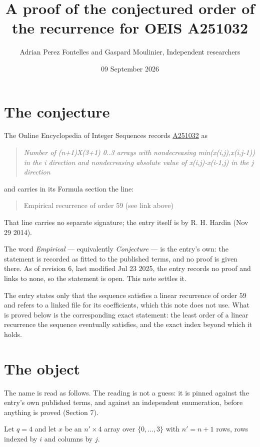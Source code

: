 \documentclass[11pt]{article}
\title{A proof of the conjectured order of the recurrence for OEIS A251032}
\author{Adrian Perez Fontelles and Gaspard Moulinier, Independent researchers}
\date{09 September 2026}
\theoremstyle{definition}
\begin{document}
\maketitle
\section{The conjecture}

The Online Encyclopedia of Integer Sequences records \href{https://oeis.org/A251032}{A251032} as

\begin{quote}\itshape Number of (n+1)X(3+1) 0..3 arrays with nondecreasing min(x(i,j),x(i,j-1)) in the i direction and nondecreasing absolute value of x(i,j)-x(i-1,j) in the j direction\end{quote}

and carries in its Formula section the line:

\begin{quote}\ttfamily Empirical recurrence of order 59 (see link above)\end{quote}

That line carries no separate signature; the entry itself is by R. H. Hardin (Nov 29 2014).

The word {\itshape Empirical} --- equivalently {\itshape Conjecture} --- is the entry's own: the statement is recorded as fitted to the published terms, and no proof is given there. As of revision 6, last modified Jul 23 2025, the entry records no proof and links to none, so the statement is open. This note settles it.

The entry states only that the sequence satisfies a linear recurrence of order $59$ and refers to a linked file for its coefficients, which this note does not use. What is proved below is the corresponding exact statement: the least order of a linear recurrence the sequence eventually satisfies, and the exact index beyond which it holds.

\section{The object}

The name is read as follows. The reading is not a guess: it is pinned against the entry's own published terms, and against an independent enumeration, before anything is proved (Section 7).

Let $q = 4$ and let $x$ be an $n' \times 4$ array over $\{0,\dots,3\}$ with $n' = n + 1$ rows, rows indexed by $i$ and columns by $j$.
\end{document}
